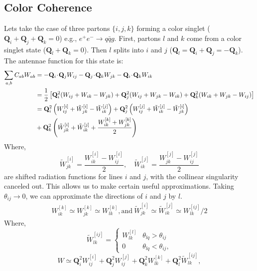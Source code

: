 
\subsection{Color Coherence}
\label{sec:colorCoherence}
Lets take the case of three partons \(\{i,j,k\}\) forming a color singlet (\(\mathbf{Q}_i + \mathbf{Q}_j +\mathbf{Q}_k = 0\)) e.g., \(e^+e^-\to q\bar{q} g\). First, partons \(l\) and \(k\) come from a color singlet state (\(\mathbf{Q}_l +\mathbf{Q}_k = 0\)). Then \(l\) splits into \(i\) and \(j\) (\(\mathbf{Q}_l = \mathbf{Q}_i + \mathbf{Q}_j = -\mathbf{Q}_k\)). The antennae function for this state is:
\begin{align}
		\label{eq:threePartonW}
  \sum_{a,b}C_{ab}W_{ab} &= -\mathbf{Q}_i\!\cdot\!\mathbf{Q}_jW_{ij} -\mathbf{Q}_j\!\cdot\!\mathbf{Q}_kW_{jk} -\mathbf{Q}_i\!\cdot\!\mathbf{Q}_kW_{ik} \notag\\
	&= \frac{1}{2}\left[\mathbf{Q}_i^2(W_{ij} + W_{ik} - W_{jk}) + \mathbf{Q}_j^2(W_{ij} + W_{jk} - W_{ik}) + \mathbf{Q}_k^2(W_{ik} + W_{jk} - W_{ij})\right]\notag\\
	&=\mathbf{Q}_i^2\left(W_{ij}^{[i]} + \tilde{W}_{jk}^{[i]} - \tilde{W}_{ik}^{[j]}\right) + \mathbf{Q}_j^2\left(W_{ij}^{[j]} + \tilde{W}_{ik}^{[j]} - \tilde{W}_{jk}^{[i]}\right) \notag\\
	& + \mathbf{Q}_k^2\left(\tilde{W}_{jk}^{[i]} + \tilde{W}_{ik}^{[j]} + \frac{W_{ik}^{[k]} + W_{jk}^{[k]} }{2}\right)
\end{align}
Where,
\begin{equation}
	\tilde{W}_{jk}^{[i]} = \frac{W^{[i]}_{ik} - W^{[i]}_{ij}}{2},\quad \tilde{W}_{ik}^{[j]} = \frac{W^{[j]}_{jk} - W^{[j]}_{ij}}{2}
\end{equation}
are shifted radiation functions for lines \(i\) and \(j\), with the collinear singularity canceled out. This allows us to make certain useful approximations. Taking \(\theta_{ij}\to0\), we can approximate the directions of \(i\) and \(j\) by \(l\). 
\begin{align}
	W_{ik}^{[k]} \simeq W_{jk}^{[k]} \simeq W_{lk}^{[k]},\text{and}~\tilde{W}_{jk}^{[i]} \simeq \tilde{W}_{ik}^{[j]} \simeq W_{lk}^{[ij]}/2 
\end{align}
Where, 
\begin{equation}
	\tilde{W}^{[ij]}_{lk} = \begin{cases}
		W^{[l]}_{lk} & \theta_{lq}>\theta_{ij}\\[-10pt]
		0            & \theta_{lq}<\theta_{ij},
	\end{cases}
\end{equation}
\begin{equation}
	W \simeq \mathbf{Q}_i^2W^{[i]}_{ij} + \mathbf{Q}_j^2W^{[j]}_{ij}
	+ \mathbf{Q}_k^2W^{[k]}_{lk} + \mathbf{Q}_l^2\tilde{W}^{[ij]}_{lk},
	\label{eq:coherentPattern}
\end{equation}

